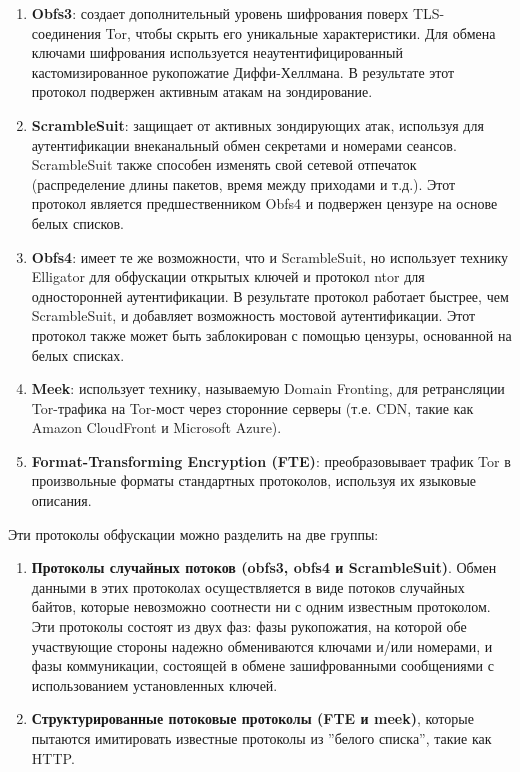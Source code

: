 \begin{enumerate}

    \item \textbf{Obfs3}: создает дополнительный уровень шифрования поверх TLS-соединения Tor, чтобы скрыть его уникальные характеристики.
    Для обмена ключами шифрования используется неаутентифицированный кастомизированное рукопожатие Диффи-Хеллмана.
    В результате этот протокол подвержен активным атакам на зондирование.

    \item \textbf{ScrambleSuit}: защищает от активных зондирующих атак, используя для аутентификации внеканальный обмен секретами и номерами сеансов.
    ScrambleSuit также способен изменять свой сетевой отпечаток (распределение длины пакетов, время между приходами и т.д.).
    Этот протокол является предшественником Obfs4 и подвержен цензуре на основе белых списков.

    \item \textbf{Obfs4}: имеет те же возможности, что и ScrambleSuit, но использует технику Elligator для обфускации открытых ключей
    и протокол ntor для односторонней аутентификации. В результате протокол работает быстрее, чем ScrambleSuit,
    и добавляет возможность мостовой аутентификации. Этот протокол также может быть заблокирован с помощью цензуры, основанной на белых списках.

    \item \textbf{Meek}: использует технику, называемую Domain Fronting, для ретрансляции Tor-трафика на Tor-мост через сторонние серверы
    (т.е. CDN, такие как Amazon CloudFront и Microsoft Azure).

    \item \textbf{Format-Transforming Encryption (FTE)}: преобразовывает трафик Tor в произвольные форматы стандартных протоколов, используя их языковые описания.

\end{enumerate}

Эти протоколы обфускации можно разделить на две группы:

\begin{enumerate}

    \item \textbf{Протоколы случайных потоков (obfs3, obfs4 и ScrambleSuit)}.
    Обмен данными в этих протоколах осуществляется в виде потоков случайных байтов,
    которые невозможно соотнести ни с одним известным протоколом.
    Эти протоколы состоят из двух фаз: фазы рукопожатия, на которой обе участвующие стороны надежно обмениваются ключами и/или номерами,
    и фазы коммуникации, состоящей в обмене зашифрованными сообщениями с использованием установленных ключей.

    \item \textbf{Структурированные потоковые протоколы (FTE и meek)},
    которые пытаются имитировать известные протоколы из ''белого списка'', такие как HTTP.

\end{enumerate}

